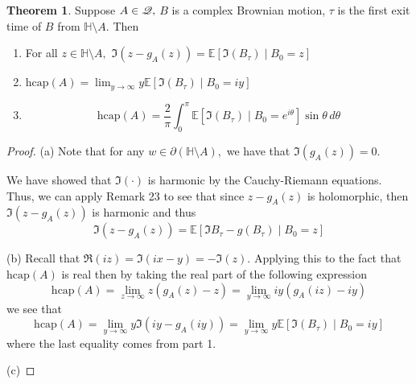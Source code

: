 \documentclass[10pt, oneside]{article}
\newcommand{\hcap}{\text{hcap}}
\newcommand{\sm}{\setminus}
\theoremstyle{definition}
\newtheorem{thm}{Theorem}
\newcommand{\bbE}{\mathbb{E}}
\newcommand{\bbH}{\mathbb{H}}
\newcommand{\sm}{\setminus}
\begin{document}
\begin{thm}
    Suppose $A \in \cal Q,$ $B$ is a complex Brownian motion, $\tau$ is the first exit time of $B$ from $\bbH \sm A.$ Then 
    \begin{enumerate}
        \item For all $z\in \bbH \sm A, $ $\Im{(z - g_A(z))} = \bbE[\Im{(B_\tau) \mid B_0 = z}]$
        \item $\hcap(A) = \lim_{y\to \infty} y \bbE[\Im{(B_\tau)} \mid B_0 = iy]$
        \item 
        \[\hcap(A)  = \frac{2}{\pi} \int_0^\pi \bbE[\Im{(B_\tau)\mid B_0 = e^{i\theta}}] \sin \theta \,d\theta\]
    \end{enumerate}
\end{thm}
\begin{proof}
    (a) Note that for any $w\in \partial (\bbH \sm {A}),$ we have that $\Im(g_A(z)) = 0.$ 
    
    We have showed that $\Im(\cdot)$ is harmonic by the Cauchy-Riemann equations. Thus, we can apply Remark 23 to see that since $z - g_A(z)$ is holomorphic, then $\Im(z - g_A(z))$ is harmonic and thus 
    \[\Im(z -g_A(z)) = \bbE[\Im{B_\tau - g(B_\tau)} \mid B_0 = z]\] 

    
    (b) Recall that $\Re(iz) = \Im(ix -y)  = -\Im(z).$ Applying this to the fact that $\hcap(A)$ is real then by taking the real part of the following expression
    \[\hcap(A) = \lim_{z\to \infty} z(g_A(z) - z) = \lim_{y\to \infty} iy(g_A(iz) - iy)\] we see that 
    \[\hcap(A) = \lim_{y\to \infty} y\Im(iy - g_A(iy)) = \lim_{y\to \infty}y \bbE[\Im(B_\tau)\mid B_0 = iy]\] where the last equality comes from part 1.

    (c) 
\end{proof}
\end{document}
